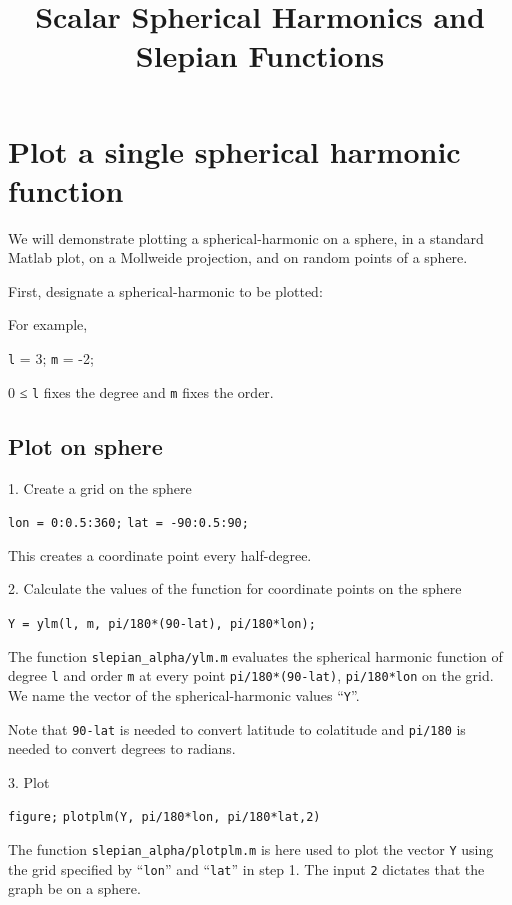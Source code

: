 \documentclass{article}
\title{Scalar Spherical Harmonics and Slepian Functions}
\author{}
\date{}
\begin{document}
\maketitle

\section{Plot a single spherical harmonic function}
We will demonstrate plotting a spherical-harmonic on a sphere,  in a standard Matlab plot, on a Mollweide projection, and on random points of a sphere.


First, designate a spherical-harmonic to be plotted:

For example,

\verb+l+ = 3; \verb+m+ = -2;

0 ≤ \verb+l+ fixes the degree and \verb+m+ fixes the order.

\subsection{Plot on sphere}

1. Create a grid on the sphere

\verb+lon = 0:0.5:360;+
\verb+lat = -90:0.5:90;+

This creates a coordinate point every half-degree.

2. Calculate the values of the function for coordinate points on the sphere

\verb+Y = ylm(l, m, pi/180*(90-lat), pi/180*lon);+

The function \verb+slepian_alpha/ylm.m+ evaluates the spherical harmonic function of degree \verb+l+ and order \verb+m+ at every point \verb+pi/180*(90-lat)+, \verb+pi/180*lon+ on the grid. We name the vector of the spherical-harmonic values “\verb+Y+”.

Note that \verb+90-lat+ is needed to convert latitude to colatitude and \verb+pi/180+ is needed to convert degrees to radians.

3. Plot

\verb+figure;+
\verb+plotplm(Y, pi/180*lon, pi/180*lat,2)+

The function \verb+slepian_alpha/plotplm.m+ is here used to plot the vector \verb+Y+ using the grid specified by “\verb+lon+” and “\verb+lat+” in step 1. The input \verb+2+ dictates that the graph be on a sphere.
\end{document}
